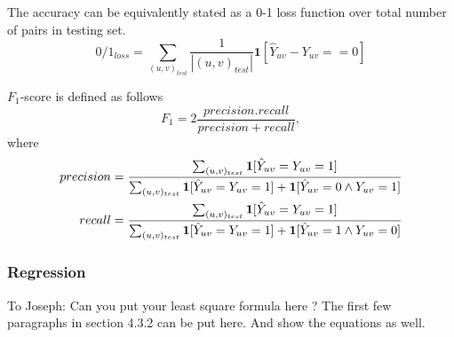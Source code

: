 	The accuracy can be equivalently stated as a 0-1 loss function over total number of pairs in testing set.
	\begin{equation}
		0/1_{loss} = \sum_{(u, v)_{test}} \frac{1}{|(u,v)_{test}|} \textbf{1}[\hat{Y}_{uv} - Y_{uv} == 0]
	\end{equation}
	
	$F_1$-score is defined as follows
	\begin{equation}
		F_1 = 2\frac{precision . recall}{precision + recall}, 
	\end{equation}
	where 
	\begin{align}
	precision &= \frac{\sum_{(u, v)_{test}} \textbf{1}[\hat{Y}_{uv} = Y_{uv} = 1]}{\sum_{(u, v)_{test}} \textbf{1}[\hat{Y}_{uv} = Y_{uv} = 1] + \textbf{1}[\hat{Y}_{uv} = 0 \wedge Y_{uv} = 1]} \\ \notag	
	recall &= \frac{\sum_{(u, v)_{test}} \textbf{1}[\hat{Y}_{uv} = Y_{uv} = 1]}{\sum_{(u, v)_{test}} \textbf{1}[\hat{Y}_{uv} = Y_{uv} = 1] + \textbf{1}[\hat{Y}_{uv} = 1 \wedge Y_{uv} = 0]}
	\end{align}
	
	\subsubsection{Regression}
	To Joseph: Can you put your least square formula here ? The first few paragraphs in section 4.3.2 can be put here. And show the equations as well.
